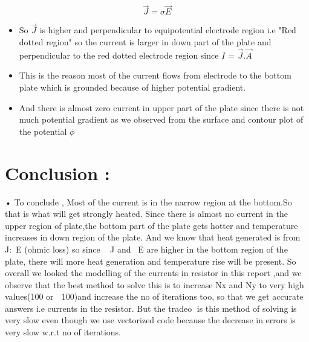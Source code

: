 \documentclass[11pt, a4paper]{article}
\begin{document}
  
  \begin{equation}
  \vec{J} = \sigma\vec{E}
     \end{equation}
  
  \begin{itemize}
  \item
    So \(\vec{J}\) is higher and perpendicular to equipotential electrode
    region i.e "Red dotted region" so the current is larger in down part
    of the plate and perpendicular to the red dotted electrode region
    since \(I\) = \(\vec{J}.\vec{A}\)
  \item
   	This is the reason most of the current flows from electrode to the
    bottom plate which is grounded because of higher potential gradient.
  \item
    And there is almost zero current in upper part of the plate since
    there is not much potential gradient as we observed from the surface
    and contour plot of the potential \(\phi\)
  \end{itemize}
  
    
  
    
      
  \section{Conclusion :}
  
  • To conclude , Most of the current is in the narrow region at the bottom.So that is what will get
strongly heated.
 Since there is almost no current in the upper region of plate,the bottom part of the plate gets
hotter and temperature increases in down region of the plate.
 And we know that heat generated is from ~ J:~E (ohmic loss) so since ~ J and ~E are higher in the
bottom region of the plate, there will more heat generation and temperature rise will be present.
 So overall we looked the modelling of the currents in resistor in this report ,and we observe that
the best method to solve this is to increase Nx and Ny to very high values(100 or  100)and
increase the no of iterations too, so that we get accurate answers i.e currents in the resistor.
 But the tradeo is this method of solving is very slow even though we use vectorized code
because the decrease in errors is very slow w.r.t no of iterations.
  
\end{document}
